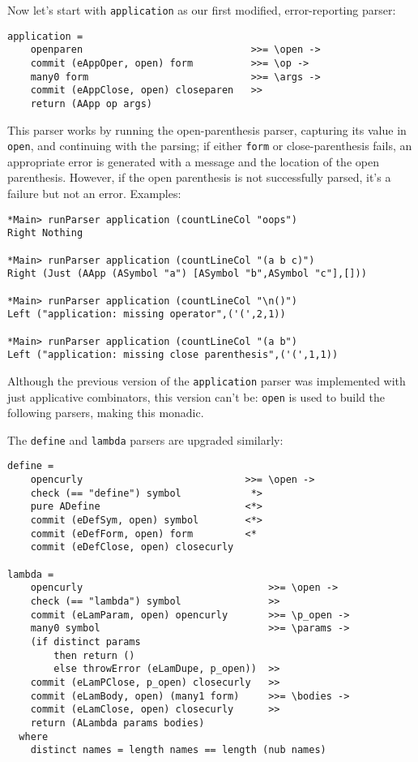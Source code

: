 \documentclass{tmr}
\begin{document}
Now let's start with \verb+application+ as our first modified, error-reporting 
parser:
\begin{verbatim}
application =
    openparen                             >>= \open ->
    commit (eAppOper, open) form          >>= \op ->
    many0 form                            >>= \args ->
    commit (eAppClose, open) closeparen   >>
    return (AApp op args)
\end{verbatim}
This parser works by running the open-parenthesis parser, capturing its value 
in \verb+open+, and continuing with the parsing; if either \verb+form+ or 
close-parenthesis fails, an appropriate error is generated with a message and 
the location of the open parenthesis.  However, if the open 
parenthesis is not successfully parsed, it's a failure but not an error.  
Examples:
\begin{verbatim}
*Main> runParser application (countLineCol "oops")
Right Nothing

*Main> runParser application (countLineCol "(a b c)")
Right (Just (AApp (ASymbol "a") [ASymbol "b",ASymbol "c"],[]))

*Main> runParser application (countLineCol "\n()")
Left ("application: missing operator",('(',2,1))

*Main> runParser application (countLineCol "(a b")
Left ("application: missing close parenthesis",('(',1,1))
\end{verbatim}

Although the previous version of the \verb+application+ parser was implemented 
with just applicative combinators, this version can't be:  \verb+open+ 
is used to build the following parsers, making this monadic.

The \verb+define+ and \verb+lambda+ parsers are upgraded similarly:
\begin{verbatim}
define =
    opencurly                            >>= \open ->
    check (== "define") symbol            *>
    pure ADefine                         <*>
    commit (eDefSym, open) symbol        <*>
    commit (eDefForm, open) form         <*
    commit (eDefClose, open) closecurly  

lambda =
    opencurly                                >>= \open ->
    check (== "lambda") symbol               >>
    commit (eLamParam, open) opencurly       >>= \p_open ->
    many0 symbol                             >>= \params ->
    (if distinct params 
        then return ()
        else throwError (eLamDupe, p_open))  >>
    commit (eLamPClose, p_open) closecurly   >>
    commit (eLamBody, open) (many1 form)     >>= \bodies ->
    commit (eLamClose, open) closecurly      >>
    return (ALambda params bodies)
  where
    distinct names = length names == length (nub names)
\end{verbatim}
\end{document}
